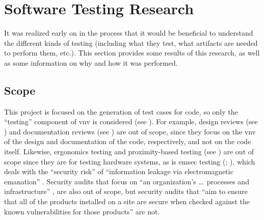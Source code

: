 \newcommand{\procLevel}[1]{``Test level'' can also refer to the scope
of a test process; for example, ``across the whole organization'' or only
``to specific projects'' #1[p.~24]{IEEE2022}}
\newcommand{\phaseDef}{can also refer to the ``period of time in the software
      life cycle'' when testing occurs \citeyearpar[p.~470]{IEEE2017}, usually
      after the implementation phase (\citeyear[pp.~420,~509]{IEEE2017};
      \citealp[p.~56]{Perry2006}).}

\newcommand{\distinctIEEE}[1]{distinct from the notion of ``test #1'' described
      in \nameref{tab:ieeeTestTerms}.}
\newcommand{\notDefDistinctIEEE}[1]{\footnote{Not formally defined, but
            \distinctIEEE{#1}}}
\newcommand{\gerrardDistinctIEEE}[1]{\footnote{``Each type of test addresses a
            different risk area'' \citep[p.~12]{Gerrard2000a}, which is
            \distinctIEEE{#1}}}

\chapter{Software Testing Research}
\label{chap:testing}

It was realized early on in the process that it would be beneficial to
understand the different kinds of testing (including what they test, what
artifacts are needed to perform them, etc.). This section provides some results
of this research, as well as some information on why and how it was performed.

\section{Scope}
\label{chap:testing:sec:scope}

\newcommand{\accelTolTest}{astronauts \citep[p.~11]{MorgunEtAl1999}, aviators
      \citep[pp.~27,~42]{HoweAndJohnson1995}, or catalysts
      \citep[p.~1463]{LiuEtAl2023}}

This project is focused on the generation of test cases for code, so only
the ``testing'' component of \acf{vnv} is considered (see ).
For example, design reviews (see \citealp[p.~132]{IEEE2017}) and
documentation reviews (see \citealp[p.~144]{IEEE2017}) are out of scope,
since they focus on the \acs{vnv} of the design and documentation of the code,
respectively, and not on the code itself. Likewise, ergonomics testing
and proximity-based testing (see \citealpISTQB{}) are out of scope since
they are for testing hardware systems, as is \acf{emsec} testing
(\citealp{ISO2021}; \citealp[p.~95]{ZhouEtAl2012}), which deals with the
``security risk'' of ``information leakage via electromagnetic emanation''
\citep[p.~95]{ZhouEtAl2012}. Security audits that focus on ``an organization's
\dots\ processes and infrastructure'' \citepISTQB{}, are also out of scope,
but security audits that ``aim to ensure that all of the products installed on
a site are secure when checked against the known vulnerabilities for those
products'' \citep[p.~28]{Gerrard2000b} are not.

